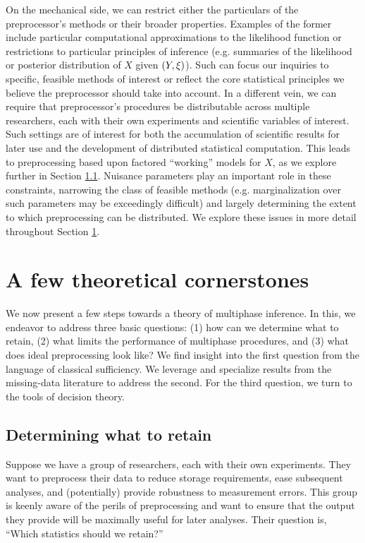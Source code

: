 On the mechanical side, we can restrict either the particulars of the preprocessor's methods or their broader properties.
Examples of the former include particular computational approximations to the likelihood function or restrictions to particular principles of inference (e.g. summaries of the likelihood or posterior distribution of $X$ given $(Y, \xi)$).
Such can focus our inquiries to specific, feasible methods of interest or reflect the core statistical principles we believe the preprocessor should take into account.
In a different vein, we can require that preprocessor's procedures be distributable across multiple researchers, each with their own experiments and scientific variables of interest.
Such settings are of interest for both the accumulation of scientific results for later use and the development of distributed statistical computation.
This leads to preprocessing based upon factored ``working'' models for $X$, as we explore further in Section \ref{multiphase:sec:sufficiency}.
Nuisance parameters play an important role in these constraints, narrowing the class of feasible methods (e.g. marginalization over such parameters may be exceedingly difficult) and largely determining the extent to which preprocessing can be distributed.
We explore these issues in more detail throughout Section \ref{multiphase:sec:theory}.

\section{A few theoretical cornerstones}
\label{multiphase:sec:theory}

We now present a few steps towards a theory of multiphase inference.
In this, we endeavor to address three basic questions: (1) how can we determine what to retain, (2) what limits the performance of multiphase procedures, and (3) what does ideal preprocessing look like?
We find insight into the first question from the language of classical sufficiency.
We leverage and specialize results from the missing-data literature  to address the second.
For the third question, we turn to the tools of decision theory.

\subsection{Determining what to retain}
\label{multiphase:sec:sufficiency}

Suppose we have a group of researchers, each with their own experiments.
They want to preprocess their data to reduce storage requirements, ease subsequent analyses, and (potentially) provide robustness to measurement errors.
This group is keenly aware of the perils of preprocessing and want to ensure that the output they provide will be maximally useful for later analyses.
Their question is, ``Which statistics should we retain?''

